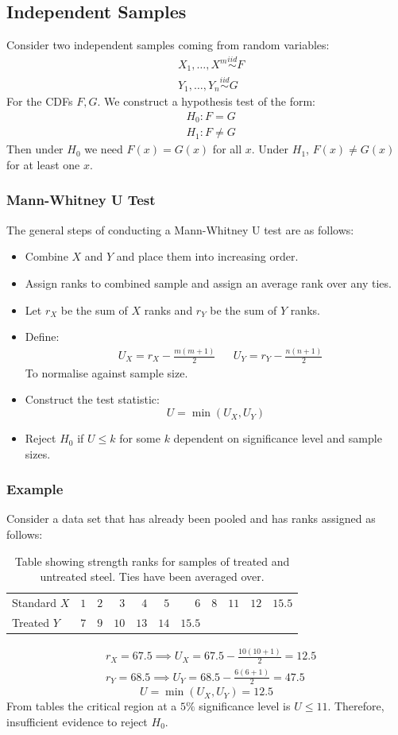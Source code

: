 \documentclass[12pt]{article}
\newcommand{\iid}{\overset{iid}{\sim}}
\begin{document}
\subsection{Independent Samples}
Consider two independent samples coming from random variables:
\begin{align*}
    &X_1,\dots,X^m\iid F \\
    &Y_1,\dots,Y_n\iid G
\end{align*}
For the CDFs \(F,G\). We construct a hypothesis test of the form:
\begin{align*}
    &H_0:F=G \\
    &H_1:F\ne G
\end{align*}
Then under \(H_0\) we need \(F(x)=G(x)\) for all \(x\). Under \(H_1\), \(F(x)\ne G(x)\) for at least one \(x\).
\subsubsection{Mann-Whitney U Test}
The general steps of conducting a Mann-Whitney U test are as follows:
\begin{itemize}
    \item Combine \(X\) and \(Y\) and place them into increasing order.
    \item Assign ranks to combined sample and assign an average rank over any ties.
    \item Let \(r_X\) be the sum of \(X\) ranks and \(r_Y\) be the sum of \(Y\) ranks.
    \item Define:
    \begin{align*}
        &U_X=r_X-\frac{m(m+1)}{2} && U_Y=r_Y-\frac{n(n+1)}{2}
    \end{align*}
    To normalise against sample size.
    \item Construct the test statistic:
    \[U=\min(U_X,U_Y)\]
    \item Reject \(H_0\) if \(U\leq k\) for some \(k\) dependent on significance level and sample sizes.
\end{itemize}
\subsubsection*{Example}
Consider a data set that has already been pooled and has ranks assigned as follows:
\begin{table}[H]
    \centering
    \begin{tabular}{l|rrrrrrrrrr}
        Standard \(X\) & \(1\) & \(2\) & \(3\) & \(4\) & \(5\) & \(6\) & \(8\) & \(11\) & \(12\) & \(15.5\) \\
        Treated \(Y\) & \(7\) & \(9\) & \(10\) & \(13\) & \(14\) & \(15.5\)
    \end{tabular}
    \caption{Table showing strength ranks for samples of treated and untreated steel. Ties have been averaged over.}
\end{table}
\begin{align*}
    &r_X=67.5 \implies U_X=67.5-\frac{10(10+1)}{2}=12.5\\
    &r_Y=68.5\implies U_Y=68.5-\frac{6(6+1)}{2}=47.5
\end{align*}
\[U=\min(U_X,U_Y)=12.5\]
From tables the critical region at a \(5\%\) significance level is \(U\leq 11\). Therefore, insufficient evidence to reject \(H_0\).
\end{document}
